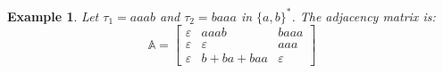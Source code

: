 \documentclass[12pt]{report}
\newtheorem{exa}[mythm]{Example}
\begin{document}
{{\begin{comment}
\noindent Implying, the elements of the sets in the vector $[\tau_1,\tau_2,\ldots,\tau_r] * \sum\limits_{n=0} \mathbb{A}^n$ are the words from all the possible clusters. Thus, the set of the words from all clusters of $\tau_1,\tau_2,\ldots,\tau_r$ is:
\[[\tau_1,\tau_2,\ldots,\tau_r]* \mathbb{A}^* * \mathbb{E}\]
where $\mathbb{E}$ is the ($r\times 1$) vector $\begin{bmatrix}
    \varepsilon \\
    \varepsilon \\
    \vdots \\
    \varepsilon
\end{bmatrix}$\\


\noindent In order to count each marked occurrence and transition this set into the desired generating function, the following mappings are used as well as proposition 4:

\begin{enumerate}[label=\roman{*})]
\item The $*$ operation $\rightarrow$ the $\cdot$ operation.
\item $[\tau_1,\tau_2,\ldots,\tau_r] \rightarrow \overline{T} \Delta(T)$
\item $\mathbb{A} \rightarrow \overline{\mathbb{A}} \Delta(T)$
\item $\mathbb{E} \rightarrow \overline{\mathbb{E}}$
\end{enumerate}

\noindent All of which lead to:
\[C_\tau (x,y_1,\ldots,y_r) = \overline{T} \Delta(T) \cdot (I - \overline{\mathbb{A}} \Delta(T))^{-1} \cdot \begin{bmatrix}
    1 \\
    1 \\
    \vdots \\
    1
\end{bmatrix}\]

\end{proof}
\end{comment}

\begin{exa} Let $\tau_1 =aaab$ and $ \tau_2 = baaa$ in $\{a,b\}^*$. The adjacency matrix is:
\[\mathbb{A} = \begin{bmatrix}
	\varepsilon & aaab & baaa \\
    \varepsilon & \varepsilon & aaa \\
    \varepsilon & b+ba+baa & \varepsilon
\end{bmatrix}\]


\end{exa}}}
\end{document}
